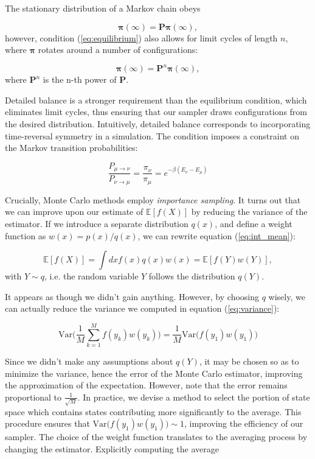 The stationary distribution of a Markov chain obeys

\begin{equation}
\bm \pi ( \infty ) = \bm P \bm \pi ( \infty ) ,
\end{equation}
however, condition (\ref{eq:equilibrium}) also allows  for limit cycles of length $n$, where $\bm \pi$ rotates around a number of configurations:

\begin{equation}
\bm \pi ( \infty ) = \bm P^n \bm \pi ( \infty ) ,
\end{equation}
where $\bm P^n$ is the n-th power of $\bm P$.

Detailed balance is a stronger requirement than the equilibrium condition, which eliminates limit cycles, thus ensuring that our sampler draws configurations from the desired distribution.
Intuitively, detailed balance corresponds to incorporating time-reversal symmetry in a simulation.
The condition imposes a constraint on the Markov transition probabilities:

\begin{equation}\label{eq:markovCondition}
\frac{P_{\mu\rightarrow\nu}}{P_{\nu\rightarrow\mu}} = \frac{\pi_\nu}{\pi_\mu} = e^{-\beta ( E_\nu - E_\mu ) }
\end{equation}

Crucially, Monte Carlo methods employ \emph{importance sampling}.
It turns out that we can improve upon our estimate of $\mathbb{E} [f(X)]$ by reducing the variance of the estimator. If we introduce a separate distribution $q(x)$, and define a weight function as $w(x) = p(x)/ q(x)$, we can rewrite equation (\ref{eq:int_mean}):

\begin{equation}
\mathbb{E} [f(X)] = \int dx f(x) q(x) w(x) = \mathbb{E} [f(Y) w(Y)],
\end{equation}
with $Y \sim q$, i.e. the random variable $Y$ follows the distribution $q(Y)$.

It appears as though we didn't gain anything. However, by choosing $q$ wisely, we can actually reduce the variance we computed in equation (\ref{eq:variance}):

\begin{equation}
\text{Var}\bigg( \frac{1}{M} \sum_{k=1}^M f(y_k) w(y_k) \bigg) = \frac{1}{M} \text{Var}\bigg( f(y_1) w(y_1) \bigg)
\end{equation}

Since we didn't make any assumptions about $q(Y)$, it may be chosen so as to minimize the variance, hence the error of the Monte Carlo estimator, improving the approximation of the expectation. However, note that the error remains proportional to $\frac{1}{\sqrt{M}}$.
In practice, we devise a method to select the portion of state space which contains states contributing more significantly to the average.
This procedure ensures that $\text{Var}\big( f(y_1) w(y_1) \big) \sim 1$, improving the efficiency of our sampler.
The choice of the weight function translates to the averaging process by changing the estimator.
Explicitly computing the average

